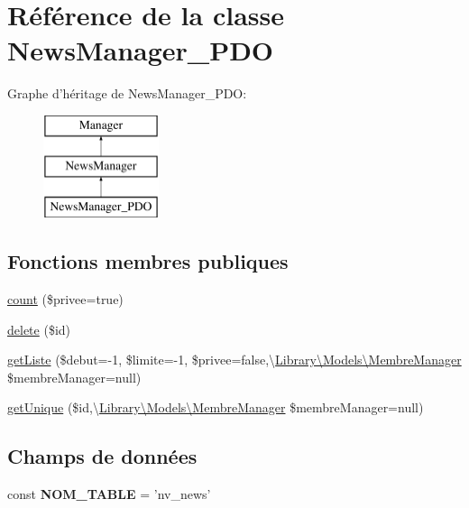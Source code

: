 \hypertarget{class_library_1_1_models_1_1_news_manager___p_d_o}{\section{Référence de la classe News\+Manager\+\_\+\+P\+D\+O}
\label{class_library_1_1_models_1_1_news_manager___p_d_o}
}
Graphe d'héritage de News\+Manager\+\_\+\+P\+D\+O\+:\begin{figure}[H]
\begin{center}
\leavevmode
\includegraphics[height=3.000000cm]{class_library_1_1_models_1_1_news_manager___p_d_o}
\end{center}
\end{figure}
\subsection*{Fonctions membres publiques}
\begin{DoxyCompactItemize}
\item 
\hyperlink{class_library_1_1_models_1_1_news_manager___p_d_o_a9bab926bf7f0b5a34ba16a961cf821fd}{count} (\$privee=true)
\item 
\hyperlink{class_library_1_1_models_1_1_news_manager___p_d_o_a2f8258add505482d7f00ea26493a5723}{delete} (\$id)
\item 
\hyperlink{class_library_1_1_models_1_1_news_manager___p_d_o_a18850922c903866df8e910553877bd04}{get\+Liste} (\$debut=-\/1, \$limite=-\/1, \$privee=false,\textbackslash{}\hyperlink{class_library_1_1_models_1_1_membre_manager}{Library\textbackslash{}\+Models\textbackslash{}\+Membre\+Manager} \$membre\+Manager=null)
\item 
\hyperlink{class_library_1_1_models_1_1_news_manager___p_d_o_a6813dfac681bc517ce0a9608f48367f3}{get\+Unique} (\$id,\textbackslash{}\hyperlink{class_library_1_1_models_1_1_membre_manager}{Library\textbackslash{}\+Models\textbackslash{}\+Membre\+Manager} \$membre\+Manager=null)
\end{DoxyCompactItemize}
\subsection*{Champs de données}
\begin{DoxyCompactItemize}
\item 
\hypertarget{class_library_1_1_models_1_1_news_manager___p_d_o_a243755033f10b0817aa9d990cc252817}{const {\bfseries N\+O\+M\+\_\+\+T\+A\+B\+L\+E} = 'nv\+\_\+news'}\label{class_library_1_1_models_1_1_news_manager___p_d_o_a243755033f10b0817aa9d990cc252817}

\end{DoxyCompactItemize}
